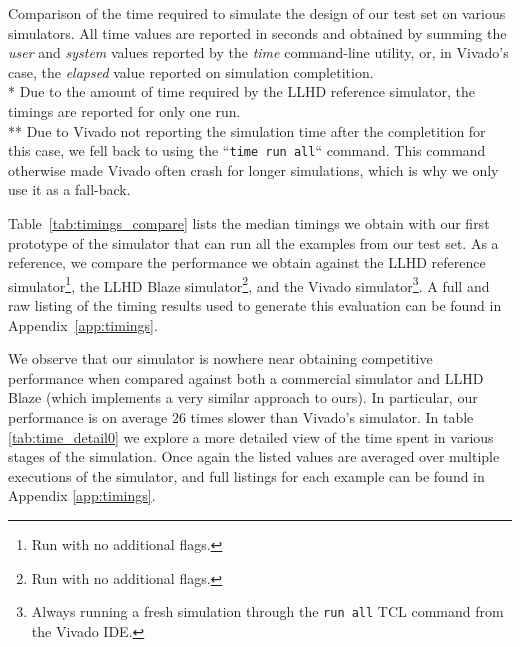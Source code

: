 \begin{table}[ht]
  \caption[Comparison of simulation timings for our first simulator prototype.]{Comparison of the time required to simulate the design of our test set on various simulators. All time values are reported in seconds and obtained by summing the \textit{user} and \textit{system} values reported by the \textit{time} command-line utility, or, in Vivado's case, the \textit{elapsed} value reported on simulation completition. \\ * Due to the amount of time required by the LLHD reference simulator, the timings are reported for only one run. \\ ** Due to Vivado not reporting the simulation time after the completition for this case, we fell back to using the “\texttt{time {run all}}“ command. This command otherwise made Vivado often crash for longer simulations, which is why we only use it as a fall-back.}
  \label{tab:timings_compare}
\end{table}

Table~\ref{tab:timings_compare} lists the median timings we obtain with our first prototype of the simulator that can run all the examples from our test set. As a reference, we compare the performance we obtain against the LLHD reference simulator\footnote{Run with no additional flags.}, the LLHD Blaze simulator\footnote{Run with no additional flags.}, and the Vivado simulator\footnote{Always running a fresh simulation through the \texttt{run all} TCL command from the Vivado IDE.}. A full and raw listing of the timing results used to generate this evaluation can be found in Appendix~\ref{app:timings}.

We observe that our simulator is nowhere near obtaining competitive performance when compared against both a commercial simulator and LLHD Blaze (which implements a very similar approach to ours). In particular, our performance is on average $26$ times slower than Vivado's simulator.
In table \ref{tab:time_detail0} we explore a more detailed view of the time spent in various stages of the simulation. Once again the listed values are averaged over multiple executions of the simulator, and full listings for each example can be found in Appendix \ref{app:timings}.

